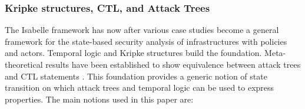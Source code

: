 \documentclass{llncs}
\begin{document}
\subsubsection{Kripke structures, CTL, and Attack Trees}
\label{sec:intro}
The Isabelle framework has now after various case studies become a general framework for
the state-based security analysis of infrastructures with policies and actors. Temporal logic
and Kripke structures build the foundation. 
Meta-theoretical results have been established to show equivalence between attack trees 
and CTL statements \cite{kam:18b}. 
This foundation provides a generic notion of state transition on which attack trees and
temporal logic can be used to express properties. 
The main notions used in this paper are:
\end{document}
